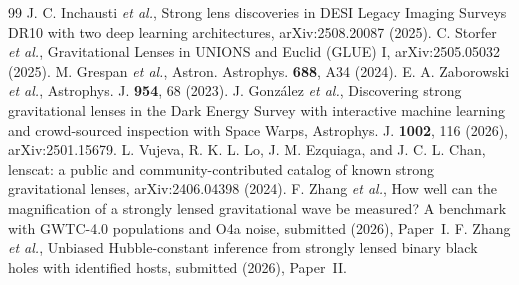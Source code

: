 \begin{thebibliography}{99}
J. C. Inchausti \textit{et al.}, Strong lens discoveries in DESI Legacy Imaging Surveys DR10 with two deep learning architectures, arXiv:2508.20087 (2025).
C. Storfer \textit{et al.}, Gravitational Lenses in UNIONS and Euclid (GLUE) I, arXiv:2505.05032 (2025).
M. Grespan \textit{et al.}, Astron. Astrophys. \textbf{688}, A34 (2024).
E. A. Zaborowski \textit{et al.}, Astrophys. J. \textbf{954}, 68 (2023).
J. Gonz\'alez \textit{et al.}, Discovering strong gravitational lenses in the Dark Energy Survey with interactive machine learning and crowd-sourced inspection with Space Warps, Astrophys. J. \textbf{1002}, 116 (2026), arXiv:2501.15679.
L. Vujeva, R. K. L. Lo, J. M. Ezquiaga, and J. C. L. Chan, lenscat: a public and community-contributed catalog of known strong gravitational lenses, arXiv:2406.04398 (2024).
F. Zhang \textit{et al.}, How well can the magnification of a strongly lensed gravitational wave be measured? A benchmark with GWTC-4.0 populations and O4a noise, submitted (2026), Paper~I.
F. Zhang \textit{et al.}, Unbiased Hubble-constant inference from strongly lensed binary black holes with identified hosts, submitted (2026), Paper~II.
\end{thebibliography}
